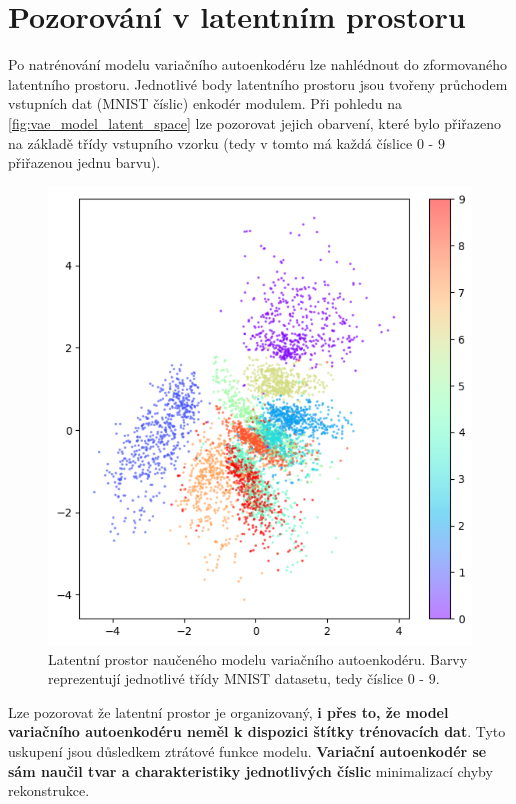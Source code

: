 \section{Pozorování v latentním prostoru}
\label{sec:vae_model_latent_space_observation}

Po natrénování modelu variačního autoenkodéru lze nahlédnout do zformovaného latentního prostoru.
Jednotlivé body latentního prostoru jsou tvořeny průchodem vstupních dat (MNIST číslic) enkodér modulem.
Při pohledu na \autoref{fig:vae_model_latent_space} lze pozorovat jejich obarvení, které bylo přiřazeno na základě třídy vstupního vzorku (tedy v tomto má každá číslice $0$ - $9$ přiřazenou jednu barvu).


\begin{figure}[H]
    \centering
    \includegraphics[width=\textwidth]{figures/latent_space_200_epochs.png}
    \caption{Latentní prostor naučeného modelu variačního autoenkodéru. Barvy reprezentují jednotlivé třídy MNIST datasetu, tedy číslice $0$ - $9$. }
    \label{fig:vae_model_latent_space}
\end{figure}

Lze pozorovat že latentní prostor je organizovaný, \textbf{i přes to, že model variačního autoenkodéru neměl k dispozici štítky trénovacích dat}. 
Tyto uskupení jsou důsledkem ztrátové funkce modelu.
\textbf{Variační autoenkodér se sám naučil tvar a charakteristiky jednotlivých číslic} minimalizací chyby rekonstrukce.

